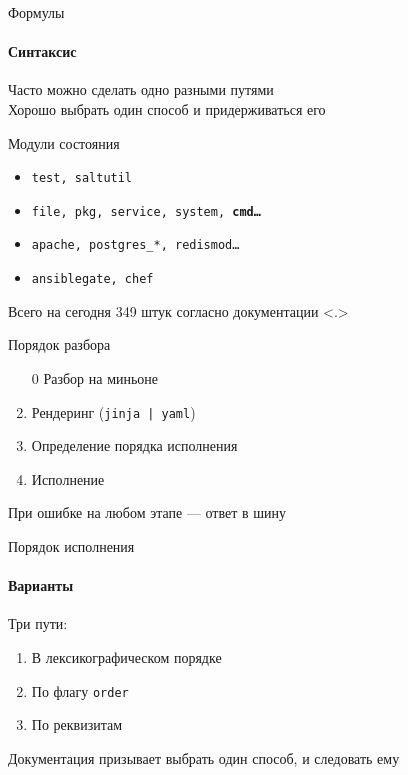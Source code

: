 \begin{frame}{Формулы}
  \framesubtitle{Синтаксис}
  \centering
  \Large
  \inlineicon{\faBomb}Часто можно сделать одно разными путями\\
  \baselinespace{}
  \pause{}
  \inlineicon{\faLightbulb} Хорошо выбрать один способ и придерживаться его
\end{frame}

\begin{Frame}{Модули состояния}
  \begin{itemize}[<+-| alert@ +>]
    \item \texttt{test, saltutil}
    \item \texttt{file, pkg, service, system, \bfseries{cmd}\dots}
    \item \texttt{apache, postgres\_*, redismod\dots}
    \item \texttt{ansiblegate, chef}
  \end{itemize}

  \vfill

  \centering
  \onslide<+->
  Всего на сегодня 349 штук согласно документации
  \only<.>{}
\end{Frame}

\liveframe{}

\begin{Frame}{Порядок разбора}
  \begin{enumerate}[<+-| alert@ +>]
    \item[0] Разбор на миньоне
    \baselinespace{}
    \item Рендеринг (\texttt{jinja | yaml})
    \baselinespace{}
    \item Определение порядка исполнения
    \baselinespace{}
    \item Исполнение
  \end{enumerate}
  \baselinespace{}

  \centering

  \onslide<+->
  \inlineicon{\faExclamationTriangle} При ошибке на любом этапе --- ответ в шину
\end{Frame}

\begin{Frame}{Порядок исполнения}
  \framesubtitle{Варианты}

  Три пути:
  \vfill
  \begin{enumerate}[<+-| alert@ +>]
    \item В лексикографическом порядке \ExampleIcon{}
    \vfill
    \item По флагу \texttt{order} \ExampleIcon{}
    \vfill
    \item По реквизитам \ExampleIcon{}
  \end{enumerate}

  \centering
  \vfill
  \onslide<+->
  \inlineicon{\faStickyNote} Документация призывает выбрать один способ, и
  следовать ему

  \vfill
\end{Frame}

